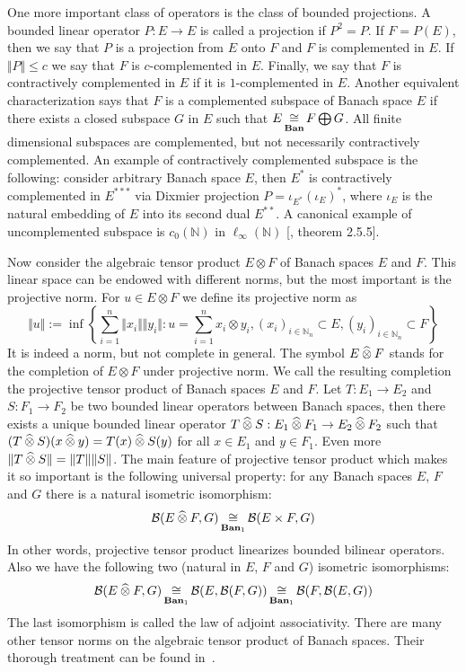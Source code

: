 One more important class of operators is the class of bounded projections. A
bounded linear operator $P:E\to E$ is called a projection if $P^2=P$. If
$F=P(E)$, then we say that $P$ is a projection from $E$ onto $F$ and $F$ is
complemented in $E$. If $\Vert P\Vert\leq c$ we say that $F$ is $c$-complemented
in $E$. Finally, we say that $F$ is contractively complemented in $E$ if it is
$1$-complemented in $E$. Another equivalent characterization says that $F$ is a
complemented subspace of Banach space $E$ if there exists a closed subspace $G$
in $E$ such that $E\mathop{\mathbin{\cong}}\limits_{\mathbf{Ban}}F\bigoplus G$. All finite dimensional
subspaces are complemented, but not necessarily contractively complemented. An
example of contractively complemented subspace is the following: consider
arbitrary Banach space $E$, then $E^*$ is contractively complemented in
$E^{***}$ via Dixmier projection $P=\iota_{E^*}{(\iota_E)}^*$, where $\iota_E$ 
is the natural embedding of $E$ into its second dual $E^{**}$. 
A canonical example of uncomplemented subspace is $c_0(\mathbb{N})$ in
$\mathbb{\ell_\infty}(\mathbb{N})$  [\cite{KalAlbTopicsBanSpTh}, theorem 2.5.5].

Now consider the algebraic tensor product $E\otimes F$ of Banach spaces $E$ and
$F$. This linear space can be endowed with different norms, but the most
important is the projective norm. For $u\in E\otimes F$ we define its projective
norm as
$$
\Vert u\Vert
:=\inf\left \{
  \sum_{i=1}^n \Vert x_i\Vert\Vert y_i\Vert
  :u=\sum_{i=1}^n x_i\otimes y_i, 
  {(x_i)}_{i\in\mathbb{N}_n}\subset E, 
  {(y_i)}_{i\in\mathbb{N}_n}\subset F
\right \}
$$
It is indeed a norm, but not complete in general. The symbol $E\mathbin{\widehat{\otimes}} F$
stands for the completion of $E\otimes F$ under projective norm. We call the
resulting completion the projective tensor product of Banach spaces $E$ and $F$.
Let $T:E_1\to E_2$ and $S:F_1\to F_2$ be two bounded linear operators between
Banach spaces, then there exists a unique bounded linear operator 
$T\mathbin{\widehat{\otimes}} S:E_1\mathbin{\widehat{\otimes}} F_1\to E_2\mathbin{\widehat{\otimes}} F_2$ 
such that  $(T\mathbin{\widehat{\otimes}} S)(x\mathbin{\widehat{\otimes}} y)=T(x)\mathbin{\widehat{\otimes}} S(y)$ 
for all $x\in E_1$ and $y\in F_1$. 
Even more $\Vert T\mathbin{\widehat{\otimes}} S\Vert=\Vert T\Vert\Vert S\Vert$. 
The main feature of projective
tensor product which makes it so important is the following universal property:
for any Banach spaces $E$, $F$ and $G$ there is a natural isometric isomorphism:
$$
\mathcal{B}(E\mathbin{\widehat{\otimes}} F,G)\mathop{\mathbin{\cong}}\limits_{\mathbf{Ban}_1}\mathcal{B}(E\times F,G)
$$
In other words, projective tensor product linearizes bounded bilinear operators.
Also we have the following two (natural in $E$, $F$ and $G$) isometric
isomorphisms:
$$
\mathcal{B}(E\mathbin{\widehat{\otimes}} F,G)
\mathop{\mathbin{\cong}}\limits_{\mathbf{Ban}_1}\mathcal{B}(E,\mathcal{B}(F,G))
\mathop{\mathbin{\cong}}\limits_{\mathbf{Ban}_1}\mathcal{B}(F,\mathcal{B}(E,G))
$$
The last isomorphism is called the law of adjoint associativity. There are many
other tensor norms on the algebraic tensor product of Banach spaces. Their
thorough treatment can be found in~\cite{DiestMetTheoryOfTensProd}.

